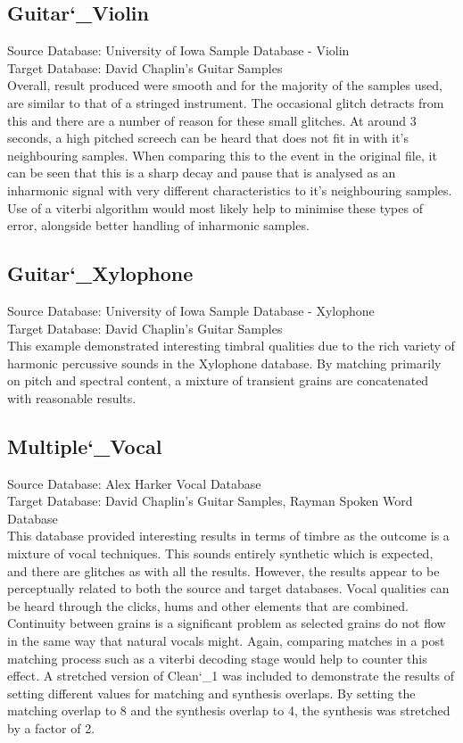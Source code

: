 \documentclass{scrartcl}
\begin{document}
    \subsection{Guitar\char`_Violin}
    Source Database: University of Iowa Sample Database - Violin\\
    Target Database: David Chaplin's Guitar Samples\\
    Overall, result produced were smooth and for the majority of the samples
    used, are similar to that of a stringed instrument. The occasional glitch
    detracts from this and there are a number of reason for these small glitches.
    At around 3 seconds, a high pitched screech can be heard that does not fit
    in with it's neighbouring samples. When comparing this to the event in the
    original file, it can be seen that this is a sharp decay and pause that is
    analysed as an inharmonic signal with very different characteristics to
    it's neighbouring samples. Use of a viterbi algorithm would most likely
    help to minimise these types of error, alongside better handling of
    inharmonic samples.

    \subsection{Guitar\char`_Xylophone}
    Source Database: University of Iowa Sample Database - Xylophone\\
    Target Database: David Chaplin's Guitar Samples\\
    This example demonstrated interesting timbral qualities due to the rich
    variety of harmonic percussive sounds in the Xylophone database. By
    matching primarily on pitch and spectral content, a mixture of transient
    grains are concatenated with reasonable results.

    \subsection{Multiple\char`_Vocal}
    Source Database: Alex Harker Vocal Database\\
    Target Database: David Chaplin's Guitar Samples, Rayman Spoken Word
    Database\\
    This database provided interesting results in terms of timbre as the outcome
    is a mixture of vocal techniques. This sounds entirely synthetic which is
    expected, and there are glitches as with all the results. However, the results
    appear to be perceptually related to both the source and target databases.
    Vocal qualities can be heard through the clicks, hums and other elements
    that are combined. Continuity between grains is a significant problem as
    selected grains do not flow in the same way that natural vocals might.
    Again, comparing matches in a post matching process such as a viterbi
    decoding stage would help to counter this effect.
    A stretched version of Clean\char`_1 was included to demonstrate the results of
    setting different values for matching and synthesis overlaps. By setting the
    matching overlap to 8 and the synthesis overlap to 4, the synthesis was
    stretched by a factor of 2.
\end{document}
